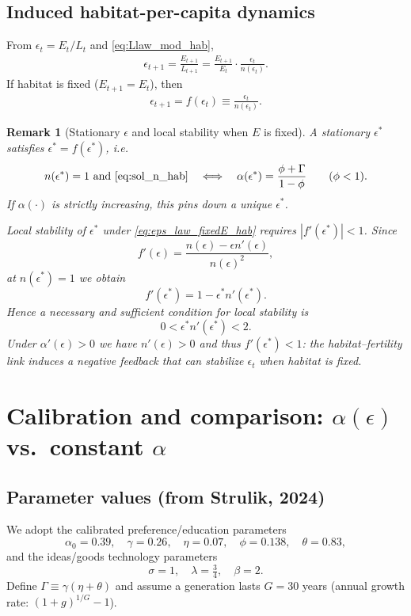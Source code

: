 \documentclass[11pt]{article}
\newtheorem{remark}{Remark}
\begin{document}
\subsection{Induced habitat-per-capita dynamics}
From $\epsilon_t=E_t/L_t$ and \eqref{eq:Llaw_mod_hab},
\begin{align}
\epsilon_{t+1}
=\frac{E_{t+1}}{L_{t+1}}
=
\frac{E_{t+1}}{E_t}\cdot \frac{\epsilon_t}{n(\epsilon_t)}.
\label{eq:eps_law_general_hab}
\end{align}
If habitat is fixed ($E_{t+1}=E_t$), then
\begin{align}
\epsilon_{t+1}
= f(\epsilon_t)
\equiv
\frac{\epsilon_t}{n(\epsilon_t)}.
\label{eq:eps_law_fixedE_hab}
\end{align}

\begin{remark}[Stationary $\epsilon$ and local stability when $E$ is fixed]
\label{rem:eps_stability_hab}
A stationary $\epsilon^\ast$ satisfies $\epsilon^\ast=f(\epsilon^\ast)$, i.e.
\[
n(\epsilon^\ast)=1 \text{ and } \eqref{eq:sol_n_hab}
\quad\Longleftrightarrow\quad
\alpha(\epsilon^\ast)=\frac{\phi+\Gamma}{1-\phi}
\qquad (\phi<1).
\]
If $\alpha(\cdot)$ is strictly increasing, this pins down a unique $\epsilon^\ast$.

Local stability of $\epsilon^\ast$ under \eqref{eq:eps_law_fixedE_hab} requires $|f'(\epsilon^\ast)|<1$.
Since
\[
f'(\epsilon)=\frac{n(\epsilon)-\epsilon n'(\epsilon)}{n(\epsilon)^2},
\]
at $n(\epsilon^\ast)=1$ we obtain
\[
f'(\epsilon^\ast)=1-\epsilon^\ast n'(\epsilon^\ast).
\]
Hence a necessary and sufficient condition for local stability is
\[
0<\epsilon^\ast n'(\epsilon^\ast)<2.
\]
Under $\alpha'(\epsilon)>0$ we have $n'(\epsilon)>0$ and thus $f'(\epsilon^\ast)<1$:
the habitat--fertility link induces a negative feedback that can stabilize $\epsilon_t$ when habitat is fixed.
\end{remark}

\section{Calibration and comparison: $\alpha(\epsilon)$ vs.\ constant $\alpha$}
\label{sec:calibration}

\subsection{Parameter values (from Strulik, 2024)}
We adopt the calibrated preference/education parameters
\[
\alpha_0=0.39,\quad \gamma=0.26,\quad \eta=0.07,\quad \phi=0.138,\quad \theta=0.83,
\]
and the ideas/goods technology parameters
\[
\sigma=1,\quad \lambda=\tfrac{3}{4},\quad \beta=2.
\]
Define $\Gamma\equiv \gamma(\eta+\theta)$ and assume a generation lasts $G=30$ years
(annual growth rate: $(1+g)^{1/G}-1$).
\end{document}

